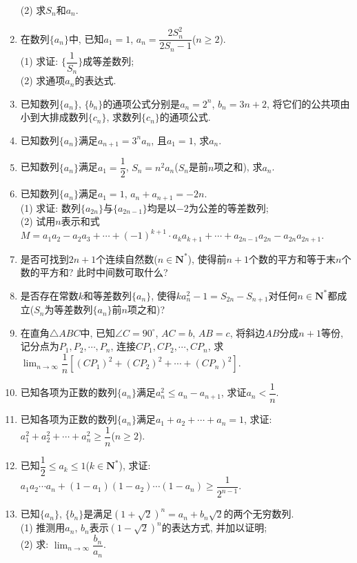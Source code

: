 \documentclass[10pt,a4paper]{article}
\begin{document}
\begin{enumerate}[1.]
(2) 求$S_n$和$a_n$.
\item 在数列$\{a_n\}$中, 已知$a_1=1$, $a_n=\dfrac{2S_n^2}{2{S_n}-1}$($n\ge 2$).\\
(1) 求证: $\{\dfrac 1{S_n}\}$成等差数列;\\
(2) 求通项$a_n$的表达式.
\item 已知数列$\{a_n\}$, $\{b_n\}$的通项公式分别是$a_n=2^n$, $b_n=3n+2$, 将它们的公共项由小到大排成数列$\{c_n\}$, 求数列$\{c_n\}$的通项公式.
\item 已知数列$\{a_n\}$满足$a_{n+1}=3^na_n$, 且$a_1=1$, 求$a_n$.
\item 已知数列$\{a_n\}$满足$a_1=\dfrac 12$, $S_n=n^2a_n$($S_n$是前$n$项之和), 求$a_n$.
\item 已知数列$\{a_n\}$满足$a_1=1$, $a_n+a_{n+1}=-2n$.\\
(1) 求证: 数列$\{a_{2n}\}$与$\{a_{2n-1}\}$均是以$-2$为公差的等差数列;\\
(2) 试用$n$表示和式$M=a_1a_2-a_2a_3+\cdots +(-1)^{k+1}\cdot a_ka_{k+1}+\cdots +a_{2n-1}a_{2n}-a_{2n}a_{2n+1}$.
\item 是否可找到$2n+1$个连续自然数($n\in \mathbf{N}^*$), 使得前$n+1$个数的平方和等于末$n$个数的平方和? 此时中间数可取什么?
\item 是否存在常数$k$和等差数列$\{a_n\}$, 使得$ka_n^2-1=S_{2n}-S_{n+1}$对任何$n\in \mathbf{N}^*$都成立($S_n$为等差数列$\{a_n\}$前$n$项之和)?
\item 在直角$\triangle ABC$中, 已知$\angle C=90^\circ$, $AC=b$, $AB=c$, 将斜边$AB$分成$n+1$等份, 记分点为$P_1,P_2,\cdots,P_n$, 连接$CP_1,CP_2,\cdots,CP_n$, 求$\displaystyle \lim_{n\to \infty} \dfrac 1n[(CP_1)^2+(CP_2)^2+\cdots +(CP_n)^2]$.
\item 已知各项为正数的数列$\{a_n\}$满足$a_n^2\le a_n-a_{n+1}$, 求证$a_n<\dfrac 1n$.
\item 已知各项为正数的数列$\{a_n\}$满足$a_1+a_2+\cdots +a_n=1$, 求证: $a_1^2+a_2^2+\cdots +a_n^2\ge \dfrac 1n$($n\ge 2$).
\item 已知$\dfrac 12\le a_k\le 1$($k\in \mathbf{N}^*$), 求证: $a_1a_2\cdots a_n+(1-a_1)(1-a_2)\cdots (1-a_n)\ge \dfrac 1{2^{n-1}}$.
\item 已知$\{a_n\}$, $\{b_n\}$是满足$(1+\sqrt 2)^n=a_n+b_n\sqrt 2$的两个无穷数列.\\
(1) 推测用$a_n$, $b_n$表示$(1-\sqrt 2)^n$的表达方式, 并加以证明;\\
(2) 求: $\displaystyle \lim_{n\to \infty} \dfrac{b_n}{a_n}$.


\end{enumerate}
\end{document}
